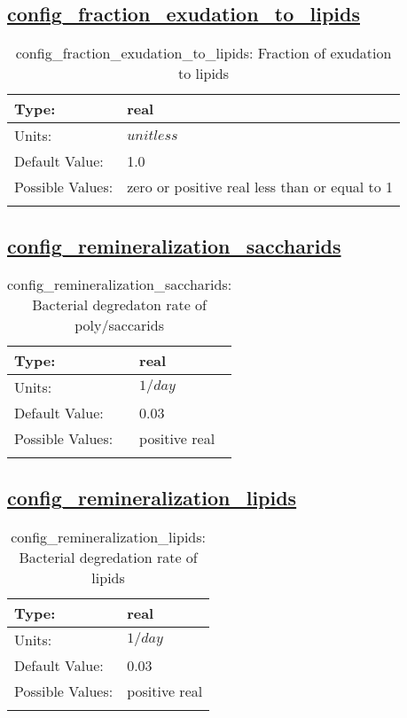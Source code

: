 \subsection[config\_fraction\_exudation\_to\_lipids]{\hyperref[sec:nm_tab_biogeochemistry]{config\_fraction\_exudation\_to\_lipids}}
\label{subsec:nm_sec_config_fraction_exudation_to_lipids}
\begin{center}
\begin{longtable}{| p{2.0in} || p{4.0in} |}
    \hline
    Type: & real \\
    \hline
    Units: & $unitless$ \\
    \hline
    Default Value: & 1.0 \\
    \hline
    Possible Values: & zero or positive real less than or equal to 1 \\
    \hline
    \caption{config\_fraction\_exudation\_to\_lipids: Fraction of exudation to lipids}
\end{longtable}
\end{center}
\subsection[config\_remineralization\_saccharids]{\hyperref[sec:nm_tab_biogeochemistry]{config\_remineralization\_saccharids}}
\label{subsec:nm_sec_config_remineralization_saccharids}
\begin{center}
\begin{longtable}{| p{2.0in} || p{4.0in} |}
    \hline
    Type: & real \\
    \hline
    Units: & $1/day$ \\
    \hline
    Default Value: & 0.03 \\
    \hline
    Possible Values: & positive real \\
    \hline
    \caption{config\_remineralization\_saccharids: Bacterial degredaton rate of poly/saccarids}
\end{longtable}
\end{center}
\subsection[config\_remineralization\_lipids]{\hyperref[sec:nm_tab_biogeochemistry]{config\_remineralization\_lipids}}
\label{subsec:nm_sec_config_remineralization_lipids}
\begin{center}
\begin{longtable}{| p{2.0in} || p{4.0in} |}
    \hline
    Type: & real \\
    \hline
    Units: & $1/day$ \\
    \hline
    Default Value: & 0.03 \\
    \hline
    Possible Values: & positive real \\
    \hline
    \caption{config\_remineralization\_lipids: Bacterial degredation rate of lipids}
\end{longtable}
\end{center}
